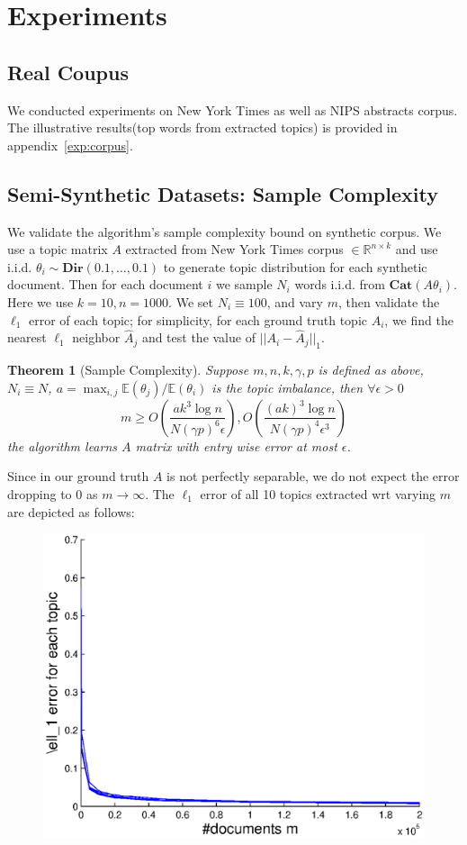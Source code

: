 \documentclass{article}
\newtheorem{thm}{Theorem}
\def\R{\mathbb{R}}
\def\E{\mathbb{E}}
\def\Cat{\mathbf{Cat}}
\def\Dir{\mathbf{Dir}}
\begin{document}
\section{Experiments}

\subsection{Real Coupus}
We conducted experiments on New York Times as well as NIPS abstracts corpus. The illustrative results(top words from extracted topics) is provided in appendix~\ref{exp:corpus}.


\subsection{Semi-Synthetic Datasets: Sample Complexity}
We validate the algorithm's sample complexity bound on synthetic corpus. We use a topic matrix $A$ extracted from New York Times corpus $\in \R^{n \times k}$ and use i.i.d. $\theta_i \sim \Dir(0.1,\ldots,0.1)$ to generate topic distribution for each synthetic document. Then for each document $i$ we sample $N_i$ words i.i.d. from $\Cat(A\theta_i)$. Here we use $k = 10, n = 1000$. We set $N_i \equiv 100$, and vary $m$, then validate the $\ell_1$ error of each topic; for simplicity, for each ground truth topic $A_i$, we find the nearest $\ell_1$ neighbor $\hat{A}_j$ and test the value of $||A_i - \hat{A}_j||_1$.

\begin{thm}[Sample Complexity\cite{AGH+13}]
Suppose $m,n,k,\gamma,p$ is defined as above, $N_i \equiv N$, $a = \max_{i,j} \E(\theta_j)/\E(\theta_i)$ is the topic imbalance, then $\forall \epsilon > 0$
$$
    m \geq O(\frac{ak^3\log n}{N(\gamma p)^6 \epsilon}), O(\frac{(ak)^3 \log n}{N (\gamma p)^4 \epsilon^3})
$$
the algorithm learns $A$ matrix with entry wise error at most $\epsilon$.
\end{thm}

Since in our ground truth $A$ is not perfectly separable, we do not expect the error dropping to $0$ as $m \to \infty$. The $\ell_1$ error of all 10 topics extracted wrt varying $m$ are depicted as follows: 
\begin{figure}[h]
\centering
\includegraphics[width=0.5\linewidth]{../code/sc.eps}
\end{figure}
\end{document}
